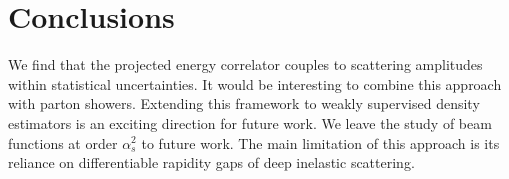 \section{Conclusions}\label{sec:conclusions}

We find that the projected energy correlator couples to scattering
amplitudes within statistical uncertainties. It would be interesting to
combine this approach with parton showers. Extending this framework to
weakly supervised density estimators is an exciting direction for future
work. We leave the study of beam functions at order $\alpha_s^2$ to
future work. The main limitation of this approach is its reliance on
differentiable rapidity gaps of deep inelastic scattering.

